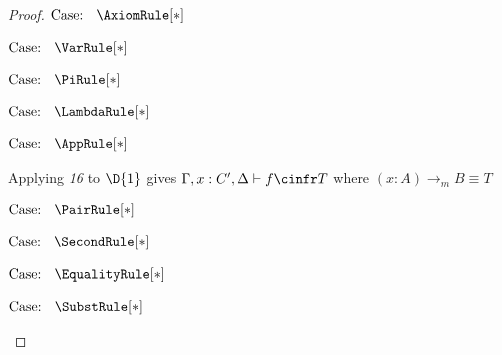 \begin{proof}
    $\text{Case: }\begin{array}{c} \AxiomRule[*] \end{array}$
    \begin{proofcase}
    \end{proofcase}

    $\text{Case: }\begin{array}{c} \VarRule[*] \end{array}$
    \begin{proofcase}
    \end{proofcase}

    $\text{Case: }\begin{array}{c} \PiRule[*] \end{array}$
    \begin{proofcase}
    \end{proofcase}

    $\text{Case: }\begin{array}{c} \LambdaRule[*] \end{array}$
    \begin{proofcase}
    \end{proofcase}

    $\text{Case: }\begin{array}{c} \AppRule[*] \end{array}$
    \begin{proofcase}
        Applying \textit{16} to $\D{1}$ gives $\Gamma, x : C^\prime, \Delta \vdash f \cinfr T$ where $(x : A) \to_m B \equiv T$
    \end{proofcase}

    $\text{Case: }\begin{array}{c} \PairRule[*] \end{array}$
    \begin{proofcase}
    \end{proofcase}

    $\text{Case: }\begin{array}{c} \SecondRule[*] \end{array}$
    \begin{proofcase}
    \end{proofcase}

    $\text{Case: }\begin{array}{c} \EqualityRule[*] \end{array}$
    \begin{proofcase}
    \end{proofcase}

    $\text{Case: }\begin{array}{c} \SubstRule[*] \end{array}$
    \begin{proofcase}
    \end{proofcase}


\end{proof}
